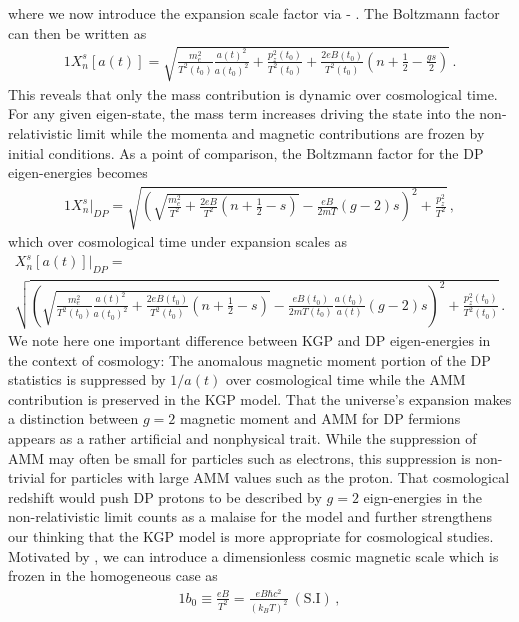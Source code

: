 where we now introduce the expansion scale factor via  - . The Boltzmann factor can then be written as
\begin{alignat}{1}
    \label{XScale} X_{n}^{s}[a(t)] = \sqrt{\frac{m_{e}^{2}}{T^{2}(t_{0})}\frac{a(t)^{2}}{a(t_{0})^{2}}+\frac{p_{z}^{2}(t_{0})}{T^{2}(t_{0})}+\frac{2eB(t_{0})}{T^{2}(t_{0})}\left(n+\frac{1}{2}-\frac{gs}{2}\right)}\,.
\end{alignat}
This reveals that only the mass contribution is dynamic over cosmological time. For any given eigen-state, the mass term increases driving the state into the non-relativistic limit while the momenta and magnetic contributions are frozen by initial conditions. As a point of comparison, the Boltzmann factor for the DP eigen-energies becomes
\begin{alignat}{1}
    \label{XDP} X_{n}^{s}\vert_{DP} = \sqrt{\left(\sqrt{\frac{m_{e}^{2}}{T^{2}}+\frac{2eB}{T^{2}}\left(n+\frac{1}{2}-s\right)}-\frac{eB}{2mT}(g-2)s\right)^{2}+\frac{p_{z}^{2}}{T^{2}}}\,,
\end{alignat}
which over cosmological time under expansion scales as
\begin{multline}
    \label{XScaleDP} X_{n}^{s}[a(t)]\vert_{DP} =\\ \sqrt{\left(\sqrt{\frac{m_{e}^{2}}{T^{2}(t_{0})}\frac{a(t)^{2}}{a(t_{0})^{2}}+\frac{2eB(t_{0})}{T^{2}(t_{0})}\left(n+\frac{1}{2}-s\right)}-\frac{eB(t_{0})}{2mT(t_{0})}\frac{a(t_{0})}{a(t)}(g-2)s\right)^{2}+\frac{p_{z}^{2}(t_{0})}{T^{2}(t_{0})}}\,.
\end{multline}
We note here one important difference between KGP and DP eigen-energies in the context of cosmology: The anomalous magnetic moment portion of the DP statistics is suppressed by $1/a(t)$ over cosmological time while the AMM contribution is preserved in the KGP model. That the universe's expansion makes a distinction between $g=2$ magnetic moment and AMM for DP fermions appears as a rather artificial and nonphysical trait. While the suppression of AMM may often be small for particles such as electrons, this suppression is non-trivial for particles with large AMM values such as the proton. That cosmological redshift would push DP protons to be described by $g=2$ eign-energies in the non-relativistic limit counts as a malaise for the model and further strengthens our thinking that the KGP model is more appropriate for cosmological studies. Motivated by , we can introduce a dimensionless cosmic magnetic scale which is frozen in the homogeneous case as
\begin{alignat}{1}
    \label{Bo} b_{0}\equiv\frac{eB}{T^{2}}=\frac{eB\hbar c^{2}}{(k_{B}T)^{2}}\ \mathrm{(S.I)}\,,
\end{alignat}
